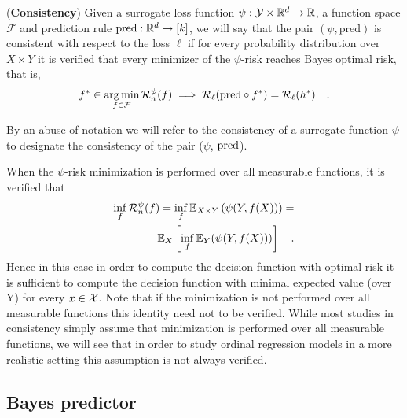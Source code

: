

\begin{definition}({\bf Consistency}) Given a surrogate loss function $\psi: \mathcal{Y}\times {\mathbb R}^d \to {\mathbb R}$, a function space $\mathcal{F}$ and prediction rule $\text{pred}: {\mathbb R}^d \to [k]$, we will say that the pair $(\psi, \text{pred})$ is consistent with respect to the loss $\ell$ if for every probability distribution over $X \times Y$ it is verified that every minimizer of the $\psi$-risk reaches Bayes optimal risk, that is,
$$f^* \in \operatorname*{arg\,min}_{f \in \mathcal{F}} \mathcal{R}_n^{\psi}(f) \implies \mathcal{R}_{\ell}(\mathrm{pred} \circ f^*) = \mathcal{R}_{\ell}(h^*) \quad .$$
\end{definition}


By an abuse of notation we will refer to the consistency of a surrogate function $\psi$ to designate the consistency of the pair ($\psi$, ${\rm pred}$).

When the $\psi$-risk minimization is performed over all measurable functions, it is verified that
\begin{equation}
\begin{aligned}\label{eq:infrisk}
\inf_{f} \Rpsi(f) = \inf_f \EE_{X \times Y}\left(\psi(Y, f(X) )\right)  = \\
\EE_{X}  \left[ \inf_{f} \EE_Y(\psi(Y, f(X)) ) \right] \quad.
\end{aligned} 
\end{equation}
Hence in this case in order to compute the decision function with optimal risk it is sufficient to compute the decision function with minimal expected value (over Y) for every $x \in \mathcal{X}$. Note that if the minimization is not performed over all measurable functions this identity need not to be verified. While most studies in consistency simply assume that minimization is performed over all measurable functions, we will see that in order to study ordinal regression models in a more realistic setting this assumption is not always verified.

\subsection{Bayes predictor} 


